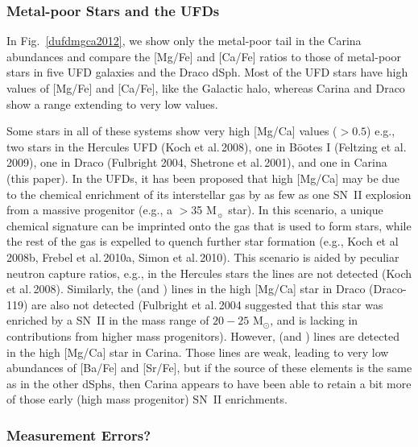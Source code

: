 \documentclass{emulateapj}
\newcommand\etal{{\rm et al.\,}}
\begin{document}
\subsubsection{ Metal-poor Stars and the UFDs }

In Fig.~\ref{dufdmgca2012}, we show only the metal-poor tail
in the Carina abundances and compare the [Mg/Fe] and [Ca/Fe] ratios to those
of metal-poor stars in five UFD galaxies and the Draco dSph.   
Most of the UFD stars have high values of [Mg/Fe] and [Ca/Fe], 
like the Galactic halo, whereas Carina and Draco show a range 
extending to very low values.    

Some stars in all of these systems show very high [Mg/Ca] values ($>0.5$) 
e.g., two stars in the Hercules UFD (Koch \etal 2008), one in B\"ootes I 
(Feltzing \etal 2009), one in Draco (Fulbright 2004, Shetrone \etal 2001),
and one in Carina (this paper).
%
In the UFDs, it has been proposed that high [Mg/Ca] may be due to the chemical
enrichment of its interstellar gas by as few as one SN~II 
explosion from a massive progenitor (e.g., a $>$35 M$_\sun$ star).
In this scenario, a unique chemical signature can be imprinted onto the gas
that is used to form stars, while the rest of the gas is expelled to quench further 
star formation (e.g., Koch et al 2008b, Frebel \etal  2010a, Simon \etal  2010).
%
This scenario is aided by peculiar neutron capture ratios, e.g., in the Hercules
stars the  lines are not detected (Koch \etal 2008).  Similarly, 
the  (and ) lines in the high [Mg/Ca] star in Draco 
(Draco-119) are also not detected (Fulbright \etal 2004 suggested that this star 
was enriched by a SN~II in the mass range of  $20 - 25$ M$_\odot$, 
and is lacking in contributions from higher mass progenitors).
%
However,  (and ) lines are detected in the high [Mg/Ca]
star in Carina.   Those lines are weak, leading to very low abundances 
of [Ba/Fe] and [Sr/Fe], but if the source of these elements is the same as
in the other dSphs, then Carina appears to have been able to retain a bit more 
of those early (high mass progenitor) SN~II enrichments.   




\subsubsection{ Measurement Errors? }
\end{document}
